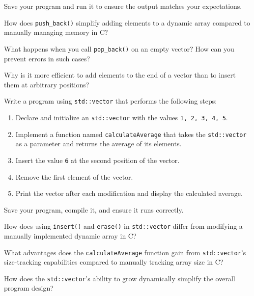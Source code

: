 \begin{challenge}
\begin{task}
        Save your program and run it to ensure the output matches your expectations.

        \begin{questions}
            \item How does \texttt{push_back()} simplify adding elements to a dynamic array compared to manually managing memory in C?
            \item What happens when you call \texttt{pop_back()} on an empty vector? How can you prevent errors in such cases?
            \item Why is it more efficient to add elements to the end of a vector than to insert them at arbitrary positions?
        \end{questions}
    \end{task}

    \begin{task}
        Write a program using \texttt{std::vector} that performs the following steps:
        \begin{enumerate}
            \item Declare and initialize an \texttt{std::vector} with the values \texttt{1, 2, 3, 4, 5}.
            \item Implement a function named \texttt{calculateAverage} that takes the \texttt{std::vector} as a parameter and returns the average of its elements.
            \item Insert the value \texttt{6} at the second position of the vector.
            \item Remove the first element of the vector.
            \item Print the vector after each modification and display the calculated average.
        \end{enumerate}

        Save your program, compile it, and ensure it runs correctly.

        \begin{questions}
            \item How does using \texttt{insert()} and \texttt{erase()} in \texttt{std::vector} differ from modifying a manually implemented dynamic array in C?
            \item What advantages does the \texttt{calculateAverage} function gain from \texttt{std::vector}'s size-tracking capabilities compared to manually tracking array size in C?
            \item How does the \texttt{std::vector}'s ability to grow dynamically simplify the overall program design?
        \end{questions}
    \end{task}


\end{challenge}
